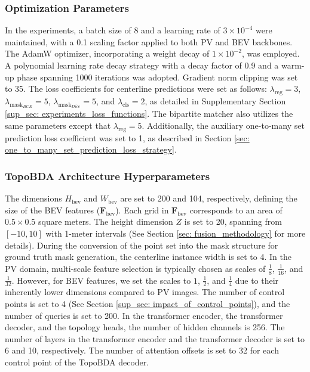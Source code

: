 \subsubsection{Optimization Parameters}

In the experiments, a batch size of 8 and a learning rate of \(3 \times 10^{-4}\) were maintained, with a 0.1 scaling factor applied to both PV and BEV backbones. The AdamW optimizer, incorporating a weight decay of \(1 \times 10^{-2}\), was employed. A polynomial learning rate decay strategy with a decay factor of 0.9 and a warm-up phase spanning 1000 iterations was adopted. Gradient norm clipping was set to 35. The loss coefficients for centerline predictions were set as follows: \(\lambda_{\text{reg}}=3\), \(\lambda_{\text{mask}_{BCE}}=5\), \(\lambda_{\text{mask}_{Dice}}=5\), and \(\lambda_{\text{cls}}=2\), as detailed in Supplementary Section \ref{sup_sec: experiments_loss_functions}. The bipartite matcher also utilizes the same parameters except that \(\lambda_{\text{reg}}=5\). Additionally, the auxiliary one-to-many set prediction loss coefficient was set to 1, as described in Section \ref{sec: one_to_many_set_prediction_loss_strategy}.


\subsubsection{TopoBDA Architecture Hyperparameters}

The dimensions \(H_{\text{bev}}\) and \(W_{\text{bev}}\) are set to 200 and 104, respectively, defining the size of the BEV features (\(\mathbf{F}_{\text{bev}}\)). Each grid in \(\mathbf{F}_{\text{bev}}\) corresponds to an area of \(0.5 \times 0.5\) square meters. The height dimension \(Z\) is set to 20, spanning from \([-10, 10]\) with 1-meter intervals (See Section \ref{sec: fusion_methodology} for more details). During the conversion of the point set into the mask structure for ground truth mask generation, the centerline instance width is set to 4. In the PV domain, multi-scale feature selection is typically chosen as scales of $\frac{1}{8}$, $\frac{1}{16}$, and $\frac{1}{32}$. However, for BEV features, we set the scales to $1$, $\frac{1}{2}$, and $\frac{1}{4}$ due to their inherently lower dimensions compared to PV images. The number of control points is set to 4 (See Section \ref{sup_sec: impact_of_control_points}), and the number of queries is set to 200. In the transformer encoder, the transformer decoder, and the topology heads, the number of hidden channels is 256. The number of layers in the transformer encoder and the transformer decoder is set to 6 and 10, respectively. The number of attention offsets is set to 32 for each control point of the TopoBDA decoder. 


